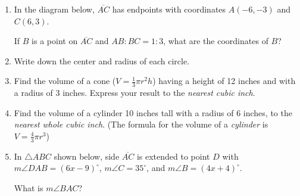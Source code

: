 \documentclass[12pt, twoside]{article}
\begin{document}
\begin{enumerate}
  \newpage
  \item In the diagram below, $\overline{AC}$ has endpoints with coordinates $A(-6,-3)$ and $C(6, 3)$.
    \begin{center} %
    \end{center}
    If $B$ is a point on $\overline{AC}$ and $AB {:} BC = 1{:}3$,  what  are  the coordinates of $B$? \vspace{5cm}

  \item Write down the center and radius of each circle.
    \begin{enumerate}
    \end{enumerate}

  \newpage

  \item Find the volume of a cone ($V=\frac{1}{3}\pi r^2 h$) having a height of 12 inches and with a radius of 3 inches. Express your result to the \emph{nearest cubic inch}. \vspace{5cm}

  \item Find the volume of a cylinder 10 inches tall with a radius of 6 inches, to the \emph{nearest whole cubic inch}. (The formula for the volume of a \emph{cylinder} is $V=\frac{4}{3}\pi r^3$)  \vspace{5cm}


 \item In  $\triangle ABC$ shown below, side $\overline{AC}$ is extended to point $D$ with $m\angle DAB=(6x-9)^\circ$, $m\angle C=35^\circ$, and $m\angle B=(4x+4)^\circ$.
   \begin{center}
   \end{center}
   What is $m\angle BAC$?


\end{enumerate}
\end{document}
